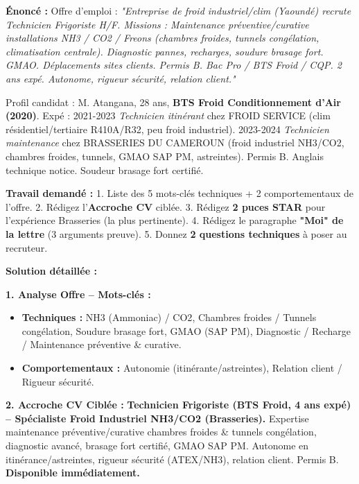 \documentclass[11pt]{article}
\newcommand{\cle}[1]{{\popxbold\color{popdark}#1}}
\begin{document}
\begin{exoresolu}
\textbf{Énoncé :} Offre d'emploi : \emph{"Entreprise de froid industriel/clim (Yaoundé) recrute Technicien Frigoriste H/F. Missions : Maintenance préventive/curative installations NH3 / CO2 / Freons (chambres froides, tunnels congélation, climatisation centrale). Diagnostic pannes, recharges, soudure brasage fort. GMAO. Déplacements sites clients. Permis B. Bac Pro / BTS Froid / CQP. 2 ans expé. Autonome, rigueur sécurité, relation client."}

Profil candidat : M. Atangana, 28 ans, \textbf{BTS Froid Conditionnement d'Air (2020)}. Expé : 2021-2023 \emph{Technicien itinérant} chez FROID SERVICE (clim résidentiel/tertiaire R410A/R32, peu froid industriel). 2023-2024 \emph{Technicien maintenance} chez BRASSERIES DU CAMEROUN (froid industriel NH3/CO2, chambres froides, tunnels, GMAO SAP PM, astreintes). Permis B. Anglais technique notice. Soudeur brasage fort certifié.

\textbf{Travail demandé :}
1. Liste des 5 mots-clés techniques + 2 comportementaux de l'offre.
2. Rédigez l'\textbf{Accroche CV} ciblée.
3. Rédigez \textbf{2 puces STAR} pour l'expérience Brasseries (la plus pertinente).
4. Rédigez le paragraphe \textbf{"Moi" de la lettre} (3 arguments preuve).
5. Donnez \textbf{2 questions techniques} à poser au recruteur.

\tcblower
\textbf{Solution détaillée :}

\textbf{1. Analyse Offre -- Mots-clés :}
\begin{itemize}
    \item \textbf{Techniques :} \cle{NH3 (Ammoniac) / CO2}, \cle{Chambres froides / Tunnels congélation}, \cle{Soudure brasage fort}, \cle{GMAO (SAP PM)}, \cle{Diagnostic / Recharge / Maintenance préventive \& curative}.
    \item \textbf{Comportementaux :} \cle{Autonomie (itinérante/astreintes)}, \cle{Relation client / Rigueur sécurité}.
\end{itemize}

\textbf{2. Accroche CV Ciblée :}
\textbf{Technicien Frigoriste (BTS Froid, 4 ans expé) -- Spécialiste Froid Industriel NH3/CO2 (Brasseries).} Expertise maintenance préventive/curative chambres froides \& tunnels congélation, diagnostic avancé, brasage fort certifié, GMAO SAP PM. Autonome en itinérance/astreintes, rigueur sécurité (ATEX/NH3), relation client. Permis B. \textbf{Disponible immédiatement.}


\end{exoresolu}
\end{document}
